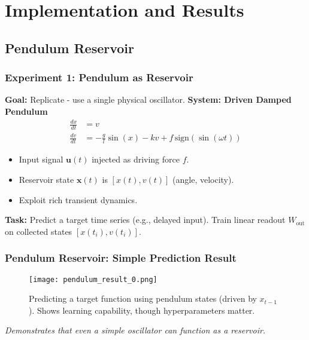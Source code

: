 \documentclass{beamer}
\begin{document}
\section{Implementation and Results}

\subsection{Pendulum Reservoir}

\begin{frame}
    \frametitle{Experiment 1: Pendulum as Reservoir}
    \textbf{Goal:} Replicate \cite{Mandal2022} - use a single physical oscillator.
    \vspace{1em}
    \textbf{System: Driven Damped Pendulum}
    \begin{equation*} %
    \begin{aligned}
    \frac{dx}{dt} &= v \\
    \frac{dv}{dt} &= -\frac{g}{l} \sin(x) - k v + f \, \text{sign}(\sin(\omega t))
    \end{aligned}
    \end{equation*}
    \begin{itemize}
        \item Input signal $\mathbf{u}(t)$ injected as driving force $f$.
        \item Reservoir state $\mathbf{x}(t)$ is $[x(t), v(t)]$ (angle, velocity).
        \item Exploit rich transient dynamics.
    \end{itemize}
    \pause
    \textbf{Task:} Predict a target time series (e.g., delayed input).
    \vspace{1em}
    Train linear readout $W_{\text{out}}$ on collected states $[x(t_i), v(t_i)]$.
\end{frame}

\begin{frame}
    \frametitle{Pendulum Reservoir: Simple Prediction Result}
     \begin{figure}
        \centering
        \texttt{[image: pendulum\_result\_0.png]}
        \caption{Predicting a target function using pendulum states (driven by $x_{t-1}$). Shows learning capability, though hyperparameters matter.}
        \label{fig:pendulum-1_slide}
    \end{figure}
    \textit{Demonstrates that even a simple oscillator can function as a reservoir.}
\end{frame}
\end{document}

